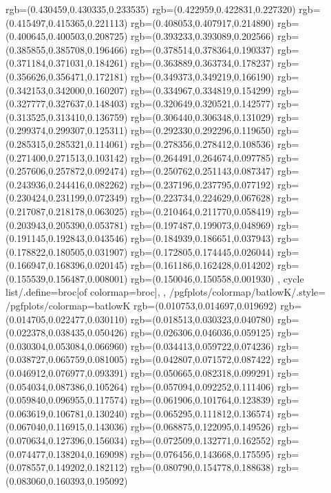 {{{			rgb=(0.430459,0.430335,0.233535)
			rgb=(0.422959,0.422831,0.227320)
			rgb=(0.415497,0.415365,0.221113)
			rgb=(0.408053,0.407917,0.214890)
			rgb=(0.400645,0.400503,0.208725)
			rgb=(0.393233,0.393089,0.202566)
			rgb=(0.385855,0.385708,0.196466)
			rgb=(0.378514,0.378364,0.190337)
			rgb=(0.371184,0.371031,0.184261)
			rgb=(0.363889,0.363734,0.178237)
			rgb=(0.356626,0.356471,0.172181)
			rgb=(0.349373,0.349219,0.166190)
			rgb=(0.342153,0.342000,0.160207)
			rgb=(0.334967,0.334819,0.154299)
			rgb=(0.327777,0.327637,0.148403)
			rgb=(0.320649,0.320521,0.142577)
			rgb=(0.313525,0.313410,0.136759)
			rgb=(0.306440,0.306348,0.131029)
			rgb=(0.299374,0.299307,0.125311)
			rgb=(0.292330,0.292296,0.119650)
			rgb=(0.285315,0.285321,0.114061)
			rgb=(0.278356,0.278412,0.108536)
			rgb=(0.271400,0.271513,0.103142)
			rgb=(0.264491,0.264674,0.097785)
			rgb=(0.257606,0.257872,0.092474)
			rgb=(0.250762,0.251143,0.087347)
			rgb=(0.243936,0.244416,0.082262)
			rgb=(0.237196,0.237795,0.077192)
			rgb=(0.230424,0.231199,0.072349)
			rgb=(0.223734,0.224629,0.067628)
			rgb=(0.217087,0.218178,0.063025)
			rgb=(0.210464,0.211770,0.058419)
			rgb=(0.203943,0.205390,0.053781)
			rgb=(0.197487,0.199073,0.048969)
			rgb=(0.191145,0.192843,0.043546)
			rgb=(0.184939,0.186651,0.037943)
			rgb=(0.178822,0.180505,0.031907)
			rgb=(0.172805,0.174445,0.026044)
			rgb=(0.166947,0.168396,0.020145)
			rgb=(0.161186,0.162428,0.014202)
			rgb=(0.155539,0.156487,0.008001)
			rgb=(0.150046,0.150558,0.001930)
		},
	cycle list/.define={broc}{[of colormap=broc]},
	},
	/pgfplots/colormap/batlowK/.style={
		/pgfplots/colormap={batlowK}{%
			rgb=(0.010753,0.014697,0.019692)
			rgb=(0.014705,0.022477,0.030110)
			rgb=(0.018513,0.030323,0.040780)
			rgb=(0.022378,0.038435,0.050426)
			rgb=(0.026306,0.046036,0.059125)
			rgb=(0.030304,0.053084,0.066960)
			rgb=(0.034413,0.059722,0.074236)
			rgb=(0.038727,0.065759,0.081005)
			rgb=(0.042807,0.071572,0.087422)
			rgb=(0.046912,0.076977,0.093391)
			rgb=(0.050665,0.082318,0.099291)
			rgb=(0.054034,0.087386,0.105264)
			rgb=(0.057094,0.092252,0.111406)
			rgb=(0.059840,0.096955,0.117574)
			rgb=(0.061906,0.101764,0.123839)
			rgb=(0.063619,0.106781,0.130240)
			rgb=(0.065295,0.111812,0.136574)
			rgb=(0.067040,0.116915,0.143036)
			rgb=(0.068875,0.122095,0.149526)
			rgb=(0.070634,0.127396,0.156034)
			rgb=(0.072509,0.132771,0.162552)
			rgb=(0.074477,0.138204,0.169098)
			rgb=(0.076456,0.143668,0.175595)
			rgb=(0.078557,0.149202,0.182112)
			rgb=(0.080790,0.154778,0.188638)
			rgb=(0.083060,0.160393,0.195092)
}}}
